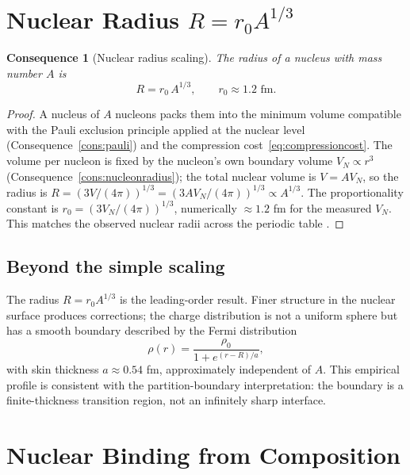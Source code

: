 \documentclass[11pt,twocolumn,a4paper]{article}
\theoremstyle{axiomstyle}
\theoremstyle{conseqstyle}
\newtheorem{consequence}{Consequence}
\theoremstyle{definition}
\theoremstyle{remark}
\begin{document}
\section{Nuclear Radius $R=r_{0}A^{1/3}$}
\label{sec:nuclearradius}

\begin{consequence}[Nuclear radius scaling]
\label{cons:nuclearradius}
The radius of a nucleus with mass number $A$ is
\begin{equation}
R=r_{0}\,A^{1/3},\qquad r_{0}\approx 1.2\text{ fm}.
\label{eq:Arootthree}
\end{equation}
\end{consequence}

\begin{proof}
A nucleus of $A$ nucleons packs them into the minimum volume compatible with the Pauli exclusion principle applied at the nuclear level (Consequence~\ref{cons:pauli}) and the compression cost~\eqref{eq:compressioncost}. The volume per nucleon is fixed by the nucleon's own boundary volume $V_{N}\propto r^{3}$ (Consequence~\ref{cons:nucleonradius}); the total nuclear volume is $V=A V_{N}$, so the radius is $R=(3V/(4\pi))^{1/3}=(3AV_{N}/(4\pi))^{1/3}\propto A^{1/3}$. The proportionality constant is $r_{0}=(3V_{N}/(4\pi))^{1/3}$, numerically $\approx 1.2$ fm for the measured $V_{N}$. This matches the observed nuclear radii across the periodic table \citep{hofstadter1956,krane1988}.
\end{proof}

\subsection{Beyond the simple scaling}

The radius $R=r_{0}A^{1/3}$ is the leading-order result. Finer structure in the nuclear surface produces corrections; the charge distribution is not a uniform sphere but has a smooth boundary described by the Fermi distribution
\begin{equation*}
\rho(r)=\frac{\rho_{0}}{1+e^{(r-R)/a}},
\end{equation*}
with skin thickness $a\approx 0.54$ fm, approximately independent of $A$. This empirical profile is consistent with the partition-boundary interpretation: the boundary is a finite-thickness transition region, not an infinitely sharp interface.

\section{Nuclear Binding from Composition}
\label{sec:nuclearbinding}
\end{document}
